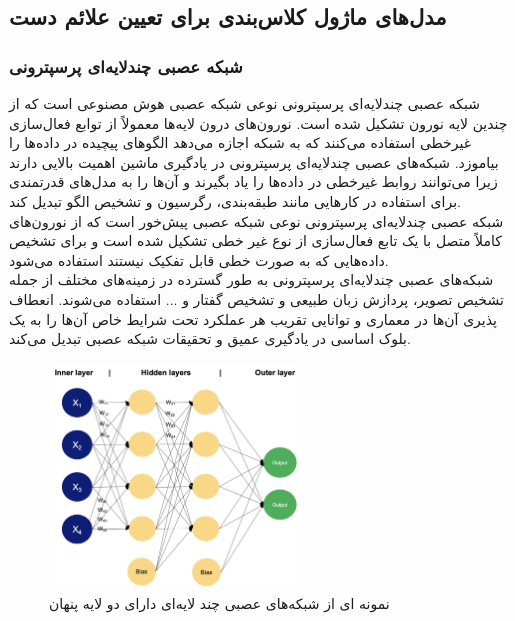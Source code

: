 


\subsection{مدل‌های ماژول کلاس‌بندی برای تعیین علائم دست}

\subsubsection{شبکه عصبی  چندلایه‌ای پرسپترونی}
شبکه عصبی  چندلایه‌ای پرسپترونی  نوعی شبکه عصبی  هوش مصنوعی است که از چندین لایه نورون تشکیل شده است. نورون‌های درون لایه‌ها معمولاً از
توابع فعال‌سازی غیرخطی  استفاده می‌کنند که به شبکه اجازه می‌دهد الگوهای پیچیده در داده‌ها را بیاموزد. شبکه‌های عصبی چندلایه‌ای پرسپترونی در 
یادگیری ماشین اهمیت بالایی دارند زیرا می‌توانند روابط غیرخطی در داده‌ها را یاد بگیرند و آن‌ها را به مدل‌های قدرتمندی برای استفاده در کارهایی مانند طبقه‌بندی، رگرسیون و تشخیص الگو تبدیل کند. 
\\
شبکه عصبی چندلایه‌ای پرسپترونی نوعی شبکه عصبی پیش‌خور است که از نورون‌های کاملاً متصل با یک تابع فعال‌سازی از نوع غیر خطی تشکیل شده است و  برای تشخیص داده‌هایی که به صورت خطی قابل تفکیک نیستند استفاده می‌شود.
\\
شبکه‌های عصبی چندلایه‌ای پرسپترونی به طور گسترده در زمینه‌های مختلف از جمله تشخیص تصویر، پردازش زبان طبیعی و تشخیص گفتار و ... استفاده می‌شوند. انعطاف پذیری آن‌ها در
معماری و توانایی تقریب هر عملکرد تحت شرایط خاص آن‌ها را به یک بلوک اساسی در یادگیری عمیق و تحقیقات شبکه عصبی تبدیل می‌کند. 

\begin{figure}[h]
    \centering
    \includegraphics[width=0.6\textwidth]{MLP.png}
    \caption[نمونه ای از شبکه‌های عصبی چند لایه‌ای دارای دو لایه پنهان]{نمونه ای از شبکه‌های عصبی چند لایه‌ای دارای دو لایه پنهان\cite{Multilay58:online}}
\end{figure}


